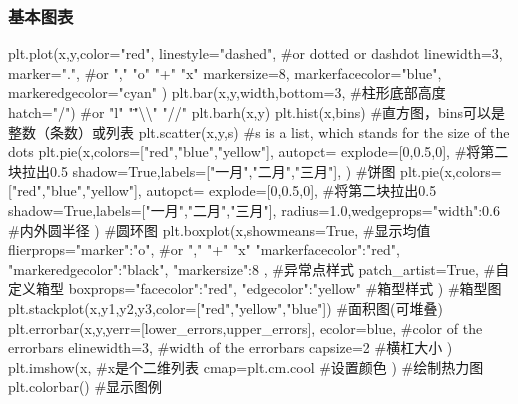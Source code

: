     \subsubsection{基本图表}  
      \begin{codeblock}[language=python, caption={plots of plt}]
        plt.plot(x,y,color="red",
                linestyle="dashed", #or dotted or dashdot
                linewidth=3,
                marker=".", #or "," "o" "+" "x"
                markersize=8,
                markerfacecolor="blue",
                markeredgecolor="cyan"
        )
        plt.bar(x,y,width,bottom=3, #柱形底部高度
                hatch="/") #or "l" "\" "\textbackslash\textbackslash" "//"
        plt.barh(x,y)
        plt.hist(x,bins) #直方图，bins可以是整数（条数）或列表
        plt.scatter(x,y,s) #s is a list, which stands for the size of the dots
        plt.pie(x,colors=["red","blue","yellow"],
                autopct=%
                explode=[0,0.5,0], #将第二块拉出0.5
                shadow=True,labels=["一月","二月","三月"],
        ) #饼图
        plt.pie(x,colors=["red","blue","yellow"],
                autopct=%
                explode=[0,0.5,0], #将第二块拉出0.5
                shadow=True,labels=["一月","二月","三月"],
                radius=1.0,wedgeprops={"width":0.6} #内外圆半径
        ) #圆环图
        plt.boxplot(x,showmeans=True, #显示均值
                    flierprops={"marker":"o", #or "," "+" "x"
                                "markerfacecolor":"red",
                                "markeredgecolor":"black",
                                "markersize":8
                    }, #异常点样式
                    patch_artist=True, #自定义箱型
                    boxprops={"facecolor":"red",
                              "edgecolor":"yellow"
                    } #箱型样式
        ) #箱型图
        plt.stackplot(x,y1,y2,y3,color=["red","yellow","blue"]) 
        #面积图(可堆叠)
        plt.errorbar(x,y,yerr=[lower_errors,upper_errors],
                    ecolor=blue, #color of the errorbars
                    elinewidth=3, #width of the errorbars
                    capsize=2 #横杠大小
        )
        plt.imshow(x, #x是个二维列表
                  cmap=plt.cm.cool #设置颜色
        ) #绘制热力图
        plt.colorbar() #显示图例
      \end{codeblock}

